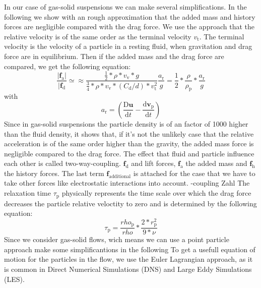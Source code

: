 \documentclass[a4paper,10pt]{article}
\renewcommand*\vec[1]{\boldsymbol{#1}}
\numberwithin{equation}{section} %
\begin{document}
In our case of gas-solid suspensions we can make several simplifications.
In the following we show with an rough approximation that the added mass and history forces are negligible compared with the drag force.
We use the approach that the relative velocity is of the same order as the terminal velocity $v_\mathrm{t}$. The terminal velocity is the velocity of a particle in a resting fluid, when gravitation and drag force are in equilibrium. Then if the added mass and the drag force are compared, we get the following equation:
\begin{equation}
\frac{|\vec{f_\mathrm{a}}|}{|\vec{f_\mathrm{d}}} \simeq \approx \frac{\frac{1}{2}*\rho*v_\mathrm{v}*g}{\frac{3}{4}*\rho*v_\mathrm{v}*(C_\mathrm{d}/d)*v_\mathrm{t}^\mathrm{2}}\frac{a_\mathrm{r}}{g} = \frac{1}{2}*\frac{\rho}{\rho_\mathrm{p}}*\frac{a_\mathrm{r}}{g}
\end{equation}
with 
\begin{equation}
a_\mathrm{r}=(\frac{\mathrm{D}\vec{u}}{\mathrm{d}t}-\frac{\mathrm{d}\vec{v_\mathrm{p}}}{\mathrm{d}t})
\end{equation}
Since in gas-solid suspensions the particle density is of an factor of 1000 higher than the fluid density, it shows that, if it's not the unlikely case that the relative acceleration is of the same order higher than the gravity, the added mass force is negligible compared to the drag force.
The effect that fluid and particle influence each other is called two-way-coupling.
$\vec{f_\mathrm{d}}$ and lift forces, $\vec{f_\mathrm{a}}$  the added mass and $\vec{f_\mathrm{h}}$ the history forces. The last term $\vec{f_\mathrm{additional}}$ is attached for the case that we have to take other forces like electrostatic interactions into account.
\newline
-coupling Zahl
\newline
The relaxation time $\tau_\mathrm{p}$ physically represents the time scale over which the drag force decreases the particle relative veloctity to zero and is determined by the following equation:
\begin{equation}
\tau_\mathrm{p} = \frac{rho_\mathrm{p}}{rho}*\frac{2*r_\mathrm{p}^\mathrm{2}}{9*\nu}
\end{equation}
Since we consider gas-solid flows, wich means  we can use a point particle approach  make some simplificantions in the following 
To get a usefull equation of motion for the particles in the flow, we use the Euler Lagrangian approach, as it is common in Direct Numerical Simulations (DNS) and Large Eddy Simulations (LES).
\end{document}
